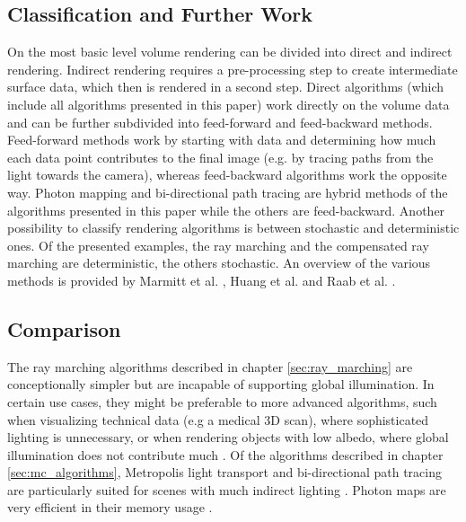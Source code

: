 \subsection{Classification and Further Work}
On the most basic level volume rendering can be divided into direct and indirect rendering\cite{Westover1991SplattingAP, 4384237}. Indirect rendering requires a pre-processing step to create intermediate surface data, which then is rendered in a second step.
Direct algorithms (which include all algorithms presented in this paper) work directly on the volume data and can be further subdivided into feed-forward and feed-backward methods. Feed-forward methods work by starting with data and determining how much each data point contributes to the final image \cite{10.5555/94788} (e.g. by tracing paths from the light towards the camera), whereas feed-backward algorithms work the opposite way. Photon mapping and bi-directional path tracing are hybrid methods of the algorithms presented in this paper while the others are feed-backward.
Another possibility to classify rendering algorithms is between stochastic and deterministic ones. Of the presented examples, the ray marching and the compensated ray marching are deterministic, the others stochastic. 
An overview of the various methods is provided by Marmitt et al. \cite{Marmitt2006InteractiveVR}, Huang et al. \cite{4384237} and Raab et al. \cite{10.1007/978-3-540-74496-2_35}.
\subsection{Comparison}
The ray marching algorithms described in chapter \ref{sec:ray_marching} are conceptionally simpler but are incapable of supporting global illumination. In certain use cases, they might be preferable to more advanced algorithms, such when visualizing technical data (e.g a medical 3D scan), where sophisticated lighting is unnecessary, or when rendering objects with low albedo, where global illumination does not contribute much \cite{10.1145/964965.808594}. Of the algorithms described in chapter \ref{sec:mc_algorithms}, Metropolis light transport and bi-directional path tracing are particularly suited for scenes with much indirect lighting \cite{metropolis, bidirectional-ray-tracing}. Photon maps are very efficient in their memory usage \cite{10.1145/280814.280925}.








% 
%       




